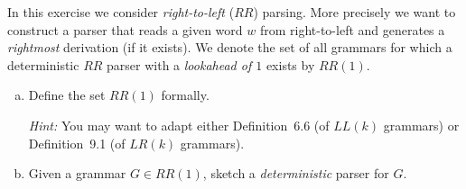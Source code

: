 \begin{exercise}{20}
    In this exercise we consider \emph{right-to-left} ($RR$) parsing. More precisely we want to construct a parser that reads a given word $w$ from right-to-left and generates a \emph{rightmost} derivation (if it exists). We denote the set of all grammars for which a deterministic $RR$ parser with a \emph{lookahead of $1$} exists by $RR(1)$.

    \begin{enumerate}[a)]
        \item Define the set $RR(1)$ formally.
        
        \emph{Hint:} You may want to adapt either Definition~6.6 (of $LL(k)$ grammars) or Definition~9.1 (of $LR(k)$ grammars).
        \item Given a grammar $G \in RR(1)$, sketch a \emph{deterministic} parser for $G$.
    \end{enumerate}
\end{exercise}

